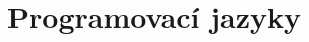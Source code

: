 \documentclass[11pt,a4paper,sans]{moderncv}        %
\begin{document}
\section{Programovací jazyky}

\nocite{*}



\clearpage
\end{document}
